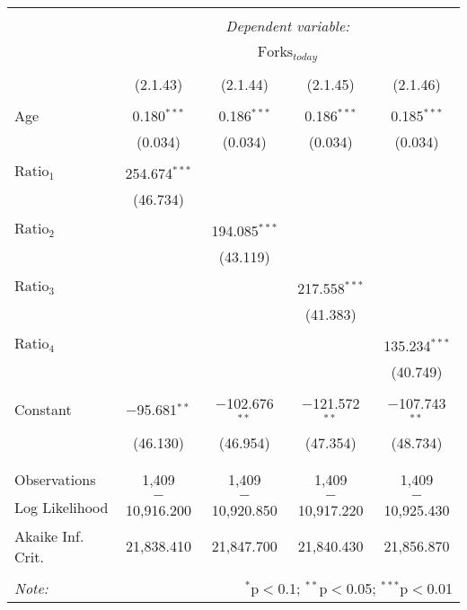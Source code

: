
\begin{tabular}{@{\extracolsep{5pt}}lcccc}
\\[-1.8ex]\hline
\hline \\[-1.8ex]
 & \multicolumn{4}{c}{\textit{Dependent variable:}} \\
\cline{2-5}
\\[-1.8ex] & \multicolumn{4}{c}{$\text{Forks}_{today}$} \\
\\[-1.8ex] & (2.1.43) & (2.1.44) & (2.1.45) & (2.1.46)\\ 
\hline \\[-1.8ex]
 Age & 0.180$^{***}$ & 0.186$^{***}$ & 0.186$^{***}$ & 0.185$^{***}$ \\
  & (0.034) & (0.034) & (0.034) & (0.034) \\
  & & & & \\
 $\text{Ratio}_{1}$ & 254.674$^{***}$ &  &  &  \\
  & (46.734) &  &  &  \\
  & & & & \\
 $\text{Ratio}_{2}$ &  & 194.085$^{***}$ &  &  \\
  &  & (43.119) &  &  \\
  & & & & \\
 $\text{Ratio}_{3}$ &  &  & 217.558$^{***}$ &  \\
  &  &  & (41.383) &  \\
  & & & & \\
 $\text{Ratio}_{4}$ &  &  &  & 135.234$^{***}$ \\
  &  &  &  & (40.749) \\
  & & & & \\
 Constant & $-$95.681$^{**}$ & $-$102.676$^{**}$ & $-$121.572$^{**}$ & $-$107.743$^{**}$ \\
  & (46.130) & (46.954) & (47.354) & (48.734) \\
  & & & & \\
\hline \\[-1.8ex]
Observations & 1,409 & 1,409 & 1,409 & 1,409 \\
Log Likelihood & $-$10,916.200 & $-$10,920.850 & $-$10,917.220 & $-$10,925.430 \\
Akaike Inf. Crit. & 21,838.410 & 21,847.700 & 21,840.430 & 21,856.870 \\
\hline
\hline \\[-1.8ex]
\textit{Note:}  & \multicolumn{4}{r}{$^{*}$p$<$0.1; $^{**}$p$<$0.05; $^{***}$p$<$0.01} \\
\end{tabular}
